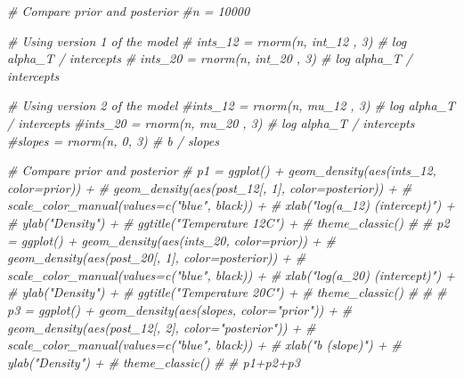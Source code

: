 \documentclass[
]{article}
\newenvironment{Shaded}{\begin{snugshade}}{\end{snugshade}}
\newcommand{\CommentTok}[1]{\textcolor[rgb]{0.56,0.35,0.01}{\textit{#1}}}
\begin{document}
\begin{Shaded}
\begin{Highlighting}[]
\CommentTok{\# Compare prior and posterior}
\CommentTok{\#n = 10000}

\CommentTok{\# Using version 1 of the model}
\CommentTok{\# ints\_12 = rnorm(n, int\_12 , 3) \# log alpha\_T / intercepts }
\CommentTok{\# ints\_20 = rnorm(n, int\_20 , 3) \# log alpha\_T / intercepts }

\CommentTok{\# Using version 2 of the model}
\CommentTok{\#ints\_12 = rnorm(n, mu\_12 , 3) \# log alpha\_T / intercepts }
\CommentTok{\#ints\_20 = rnorm(n, mu\_20 , 3) \# log alpha\_T / intercepts }
\CommentTok{\#slopes = rnorm(n, 0, 3) \# b / slopes}

\CommentTok{\# Compare prior and posterior}
\CommentTok{\# p1 = ggplot() + geom\_density(aes(ints\_12, color=\textquotesingle{}prior\textquotesingle{})) +}
\CommentTok{\#               geom\_density(aes(post\_12[, 1], color=\textquotesingle{}posterior\textquotesingle{})) + }
\CommentTok{\#               scale\_color\_manual(values=c("blue", \textquotesingle{}black\textquotesingle{})) +}
\CommentTok{\#               xlab("log(a\_12) (intercept)") + }
\CommentTok{\#               ylab("Density") +}
\CommentTok{\#         ggtitle("Temperature 12C") +}
\CommentTok{\#               theme\_classic()}
\CommentTok{\# }
\CommentTok{\# p2 = ggplot() + geom\_density(aes(ints\_20, color=\textquotesingle{}prior\textquotesingle{})) +}
\CommentTok{\#               geom\_density(aes(post\_20[, 1], color=\textquotesingle{}posterior\textquotesingle{})) + }
\CommentTok{\#               scale\_color\_manual(values=c("blue", \textquotesingle{}black\textquotesingle{})) +}
\CommentTok{\#               xlab("log(a\_20) (intercept)") + }
\CommentTok{\#               ylab("Density") +}
\CommentTok{\#         ggtitle("Temperature 20C") +}
\CommentTok{\#               theme\_classic()}
\CommentTok{\# }
\CommentTok{\# }
\CommentTok{\# p3 = ggplot() + geom\_density(aes(slopes, color="prior")) +}
\CommentTok{\#               geom\_density(aes(post\_12[, 2], color="posterior")) +}
\CommentTok{\#               scale\_color\_manual(values=c("blue", \textquotesingle{}black\textquotesingle{})) +}
\CommentTok{\#               xlab("b (slope)") + }
\CommentTok{\#               ylab("Density") +}
\CommentTok{\#               theme\_classic()}
\CommentTok{\# }
\CommentTok{\# p1+p2+p3}
\end{Highlighting}
\end{Shaded}
\end{document}
